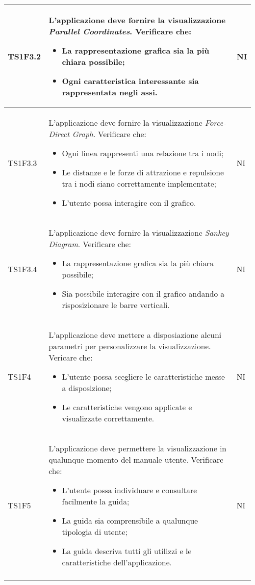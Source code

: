 \begin{tabular}{|p{2cm}|p{4cm}|p{4cm}|}
        TS1F3.2 & L'applicazione deve fornire la visualizzazione  \textit{Parallel Coordinates}. Verificare che: \begin{itemize}
            \item La rappresentazione grafica sia la più chiara possibile;
            \item Ogni caratteristica interessante sia rappresentata negli assi.
        \end{itemize} & NI\\ \hline

        TS1F3.3 & L'applicazione deve fornire la visualizzazione  \textit{Force-Direct Graph}. Verificare che: \begin{itemize}
            \item Ogni linea rappresenti una relazione tra i nodi;
            \item Le distanze e le forze di attrazione e repulsione tra i nodi siano correttamente implementate;
            \item L'utente possa interagire con il grafico.
        \end{itemize} & NI\\ \hline

        TS1F3.4 & L'applicazione deve fornire la visualizzazione  \textit{Sankey Diagram}. Verificare che: \begin{itemize}
            \item La rappresentazione grafica sia la più chiara possibile;
            \item Sia possibile interagire con il grafico andando a risposizionare le barre verticali.
        \end{itemize} & NI\\ \hline

        TS1F4 & L'applicazione deve mettere a disposiazione alcuni parametri per personalizzare la visualizzazione. Vericare che: \begin{itemize}
            \item L'utente possa scegliere le caratteristiche messe a disposizione;
            \item Le caratteristiche vengono applicate e visualizzate correttamente.
        \end{itemize} & NI\\ \hline

        TS1F5 & L'applicazione deve permettere la visualizzazione in qualunque momento del manuale utente. Verificare che: \begin{itemize}
            \item L'utente possa individuare e consultare facilmente la guida;
            \item La guida sia comprensibile a qualunque tipologia di utente;
            \item La guida descriva tutti gli utilizzi e le caratteristiche dell'applicazione.
        \end{itemize}& NI\\ \hline
        & & \\ \hline


\end{tabular}
